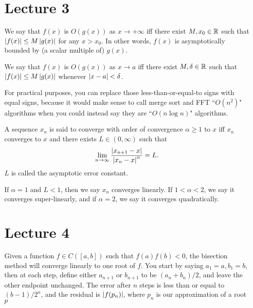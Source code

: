 \documentclass{article}
\begin{document}
\section{Lecture 3}
We say that $f(x)$ is $O(g(x))$ as $x \rightarrow +\infty$ iff there exist $M, x_0 \in \mathbb{R}$ such that $\left\lvert f(x) \right\rvert \leq M \left\lvert g(x) \right\rvert$ for any $x > x_0$. In other words, $f(x)$ is asymptotically bounded by (a scalar multiple of) $g(x)$.
\par
We say that $f(x)$ is $O(g(x))$ as $x \rightarrow a$ iff there exist $M, \delta \in \mathbb{R}$ such that $\left\lvert f(x) \right\rvert \leq M \left\lvert g(x) \right\rvert$ whenever $\left\lvert x-a \right\rvert<\delta$.
\par
For practical purposes, you can replace those less-than-or-equal-to signs with equal signs, because it would make sense to call merge sort and FFT ``$O(n^2)$" algorithms when you could instead say they are ``$O(n \log n)$" algorithms.
\par
A sequence $x_n$ is said to converge with order of convergence $\alpha \geq 1$ to $x$ iff $x_n$ converges to $x$ and there exists $L \in (0, \infty)$ such that
\[ \lim_{n \rightarrow \infty} \frac{\left\lvert x_{n+1}-x \right\rvert}{\left\lvert x_n-x \right\rvert^\alpha} = L.\]
$L$ is called the asymptotic error constant.
\par
If $\alpha=1$ and $L<1$, then we say $x_n$ converges linearly. If $1 < \alpha < 2$, we say it converges super-linearly, and if $\alpha=2$, we say it converges quadratically.

\section{Lecture 4}
Given a function $f \in C([a,b])$ such that $f(a)f(b)<0$, the bisection method will converge linearly to one root of $f$. You start by saying $a_1=a, b_1=b$, then at each step, define either $a_{n+1}$ or $b_{n+1}$ to be $(a_n+b_n)/2$, and leave the other endpoint unchanged. The error after $n$ steps is less than or equal to $(b-1)/2^n$, and the residual is $\left\lvert f(p_n) \right\rvert$, where $p_n$ is our approximation of a root $p$
\end{document}
